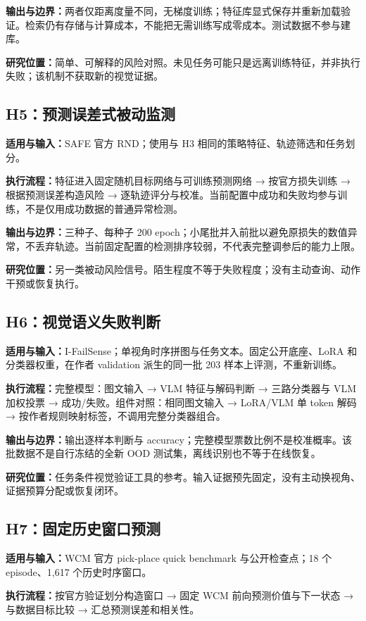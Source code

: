 \documentclass[UTF8,11pt,a4paper,fontset=none]{ctexart}
\begin{document}
\textbf{输出与边界：}两者仅距离度量不同，无梯度训练；特征库显式保存并重新加载验证。检索仍有存储与计算成本，不能把无需训练写成零成本。测试数据不参与建库。

\textbf{研究位置：}简单、可解释的风险对照。未见任务可能只是远离训练特征，并非执行失败；该机制不获取新的视觉证据。

\subsection*{H5：预测误差式被动监测}
\textbf{适用与输入：}SAFE 官方 RND；使用与 H3 相同的策略特征、轨迹筛选和任务划分。

\textbf{执行流程：}特征进入固定随机目标网络与可训练预测网络 → 按官方损失训练 → 根据预测误差构造风险 → 逐轨迹评分与校准。当前配置中成功和失败均参与训练，不是仅用成功数据的普通异常检测。

\textbf{输出与边界：}三种子、每种子 200 epoch；小尾批并入前批以避免原损失的数值异常，不丢弃轨迹。当前固定配置的检测排序较弱，不代表完整调参后的能力上限。

\textbf{研究位置：}另一类被动风险信号。陌生程度不等于失败程度；没有主动查询、动作干预或恢复执行。

\subsection*{H6：视觉语义失败判断}
\textbf{适用与输入：}I-FailSense；单视角时序拼图与任务文本。固定公开底座、LoRA 和分类器权重，在作者 validation 派生的同一批 203 样本上评测，不重新训练。

\textbf{执行流程：}完整模型：图文输入 → VLM 特征与解码判断 → 三路分类器与 VLM 加权投票 → 成功/失败。组件对照：相同图文输入 → LoRA/VLM 单 token 解码 → 按作者规则映射标签，不调用完整分类器组合。

\textbf{输出与边界：}输出逐样本判断与 accuracy；完整模型票数比例不是校准概率。该批数据不是自行冻结的全新 OOD 测试集，离线识别也不等于在线恢复。

\textbf{研究位置：}任务条件视觉验证工具的参考。输入证据预先固定，没有主动换视角、证据预算分配或恢复闭环。

\clearpage
\subsection*{H7：固定历史窗口预测}
\textbf{适用与输入：}WCM 官方 pick-place quick benchmark 与公开检查点；18 个 episode、1,617 个历史时序窗口。

\textbf{执行流程：}按官方验证划分构造窗口 → 固定 WCM 前向预测价值与下一状态 → 与数据目标比较 → 汇总预测误差和相关性。
\end{document}

